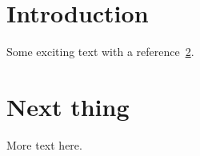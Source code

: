 \documentclass{article}
\begin{document}
\section{Introduction}
Some exciting text with a reference~\ref{sec:next}.
\section{Next thing}
\label{sec:next}
More text here.
\end{document}
